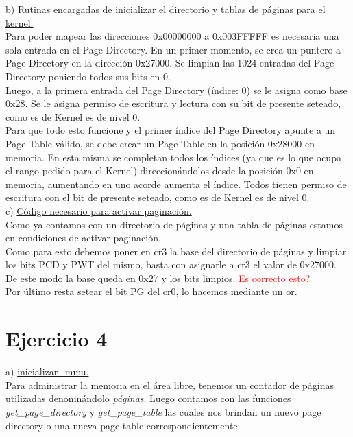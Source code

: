 \documentclass[a4paper]{article}
\begin{document}
{\large b)} \underline{Rutinas encargadas de inicializar el directorio y tablas de p\'aginas para el kernel.}\\

Para poder mapear las direcciones 0x00000000 a 0x003FFFFF es necesaria una sola entrada en el Page Directory. En un primer momento, se crea un puntero a Page Directory en la direcci\'on 0x27000. Se limpian las 1024 entradas del Page Directory poniendo todos sus bits en 0.\\

Luego, a la primera entrada del Page Directory (\'indice: 0) se le asigna como base 0x28. Se le asigna permiso de escritura y lectura con su bit de presente seteado, como es de Kernel es de nivel 0.\\

Para que todo esto funcione y el primer \'indice del Page Directory apunte a un Page Table v\'alido, se debe crear un Page Table en la posici\'on 0x28000 en memoria. En esta misma se completan todos los \'indices (ya que es lo que ocupa el rango pedido para el Kernel) direccion\'andolos desde la posici\'on 0x0 en memoria, aumentando en uno acorde aumenta el \'indice. Todos tienen permiso de escritura con el bit de presente seteado, como es de Kernel es de nivel 0.\\



{\large c)} \underline{C\'odigo necesario para activar paginaci\'on.}\\

Como ya contamos con un directorio de p\'aginas y una tabla de p\'aginas estamos en condiciones de activar paginaci\'on.\\


Como para esto debemos poner en cr3 la base del directorio de p\'aginas y limpiar los bits PCD y PWT del mismo, basta con asignarle a cr3 el valor de 0x27000. De este modo la base queda en 0x27 y los bits limpios. \textcolor{red}{Es correcto esto?}\\

Por \'ultimo resta setear el bit PG del cr0, lo hacemos mediante un or.

\newpage
\section{Ejercicio 4}
{\large a)} \underline{inicializar_mmu.}\\


Para administrar la memoria en el área libre, tenemos un contador de páginas utilizadas denoninándolo \textit{páginas}. Luego contamos con las funciones \textit{get_page_directory} y \textit{get_page_table} las cuales nos brindan un nuevo page directory o una nueva page table correspondientemente.
\end{document}
